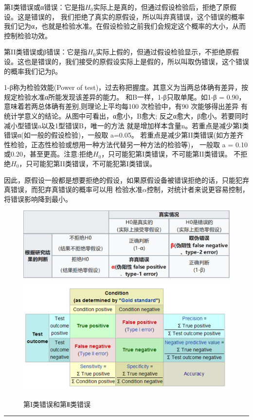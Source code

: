 \documentclass[
]{article}
\begin{document}
第I类错误或α错误：它是指\(H_0\)实际上是真的，但通过假设检验后，拒绝了原假设。这是错误的，
我们拒绝了真实的原假设，所以叫弃真错误，这个错误的概率我们记为α，也就是检验水准。在假设检验之前我们会规定这个概率的大小，从而控制检验功效。

第II类错误或β错误：它是指\(H_0\)实际上假的，但通过假设检验显示，不拒绝原假设。这也是错误的，我们接受的原假设实际上是假的，所以叫取伪错误，这个错误的概率我们记为β。

1-β称为检验效能(Power of test)，过去称把握度。其意义为当两总体确有差异，按规定检验水准α所能发现该差异的能力。
和B一样，1-β只取单尾。如1-β = 0.90，意味着若两总体确有差别,则理论上平均每100 次检验中，有90 次能够得出差异
有统计学意义的结论。从图中可看出，α愈小，B愈大; 反之α愈大，β愈小。若要同时减小型错误a以及1型错误B，唯一的方法
就是增加样本含量n。若重点是减少第I类错误α(如一般的假设检验)，一般取 a=0.05。
若重点是减少第II类错误(如方差齐性检验，正态性检验或想用一种方法代替另一种方法的检验等)，
一般取 a = 0.10 或0.20，甚至更高。注意:拒绝\(H_0\)，只可能犯第I类错误，不可能第II类错误。
不拒绝\(H_0\)，只可能犯第II类错误，不可能犯第I类错误。

因此，原假设一般都是想要拒绝的假设，如果原假设备被错误拒绝的话，只能犯弃真错误，而犯弃真错误的概率可以用
检验水准\(\alpha\)控制，对统计者来说更容易控制，将错误影响降到最小。

\begin{figure}

{\centering \includegraphics[width=0.49\linewidth,height=0.49\textheight]{image/type12error} \includegraphics[width=0.49\linewidth,height=0.49\textheight]{image/type12error_en} 

}

\caption{第I类错误和第Ⅱ类错误}\label{fig:typeerror}
\end{figure}

\begin{center}\rule{0.5\linewidth}{0.5pt}\end{center}
\end{document}

